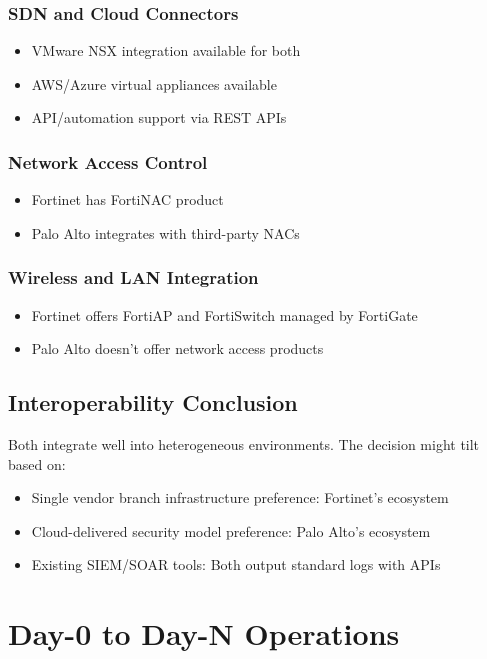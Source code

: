\documentclass[12pt]{article}
\begin{document}
\subsubsection{SDN and Cloud Connectors}
\begin{itemize}
    \item VMware NSX integration available for both
    \item AWS/Azure virtual appliances available
    \item API/automation support via REST APIs
\end{itemize}

\subsubsection{Network Access Control}
\begin{itemize}
    \item Fortinet has FortiNAC product
    \item Palo Alto integrates with third-party NACs
\end{itemize}

\subsubsection{Wireless and LAN Integration}
\begin{itemize}
    \item Fortinet offers FortiAP and FortiSwitch managed by FortiGate
    \item Palo Alto doesn't offer network access products
\end{itemize}

\subsection{Interoperability Conclusion}

Both integrate well into heterogeneous environments. The decision might tilt based on:
\begin{itemize}
    \item Single vendor branch infrastructure preference: Fortinet's ecosystem
    \item Cloud-delivered security model preference: Palo Alto's ecosystem
    \item Existing SIEM/SOAR tools: Both output standard logs with APIs
\end{itemize}

\section{Day-0 to Day-N Operations}
\end{document}

